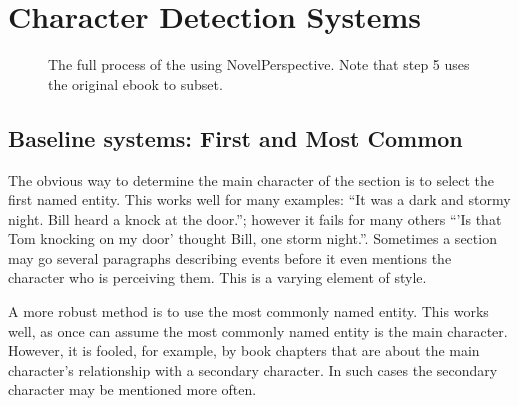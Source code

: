 \documentclass[11pt,a4paper]{article}
\begin{document}
\section{Character Detection Systems}
\begin{figure*}
	\caption{The full process of the using NovelPerspective. Note that step 5 uses the original ebook to subset. \label{fig:classify}
	}
\end{figure*}



\subsection{Baseline systems: First and Most Common}
The obvious way to determine the main character of the section is to select the first named entity. This works well for many examples: ``It was a dark and stormy night. Bill heard a knock at the door.''; however it fails for many others ``'Is that Tom knocking on my door' thought Bill, one storm night.''.
Sometimes a section  may go several paragraphs describing events before it even mentions the character who is perceiving them.
This is a varying element of style.

A more robust method is to use the most commonly named entity.
This works well, as once can assume the most commonly named entity is the main character.
However, it is fooled, for example, by book chapters that are about the main character's relationship with a secondary character.
In such cases the secondary character may be mentioned more often.
\end{document}
